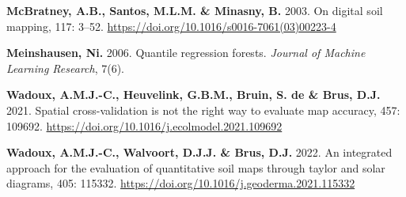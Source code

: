 \documentclass[
  10pt,
  b5paper,
  oneside]{book}
\newlength{\cslhangindent}
\newlength{\cslentryspacingunit} %
\newenvironment{CSLReferences}[2] %
 {%
  \setlength{\parindent}{0pt}
  \ifodd #1
  \let\oldpar\par
  \def\par{\hangindent=\cslhangindent\oldpar}
  \fi
  \setlength{\parskip}{#2\cslentryspacingunit}
 }%
 {}
\begin{document}
\begin{CSLReferences}{0}{0}
\leavevmode{}%
\textbf{McBratney, A.B., Santos, M.L.M. \& Minasny, B.} 2003. On digital soil mapping, 117: 3--52. \url{https://doi.org/10.1016/s0016-7061(03)00223-4}

\leavevmode{}%
\textbf{Meinshausen, Ni.} 2006. Quantile regression forests. \emph{Journal of Machine Learning Research}, 7(6).

\leavevmode{}%
\textbf{Wadoux, A.M.J.-C., Heuvelink, G.B.M., Bruin, S. de \& Brus, D.J.} 2021. Spatial cross-validation is not the right way to evaluate map accuracy, 457: 109692. \url{https://doi.org/10.1016/j.ecolmodel.2021.109692}

\leavevmode{}%
\textbf{Wadoux, A.M.J.-C., Walvoort, D.J.J. \& Brus, D.J.} 2022. An integrated approach for the evaluation of quantitative soil maps through taylor and solar diagrams, 405: 115332. \url{https://doi.org/10.1016/j.geoderma.2021.115332}

\end{CSLReferences}


\end{document}
